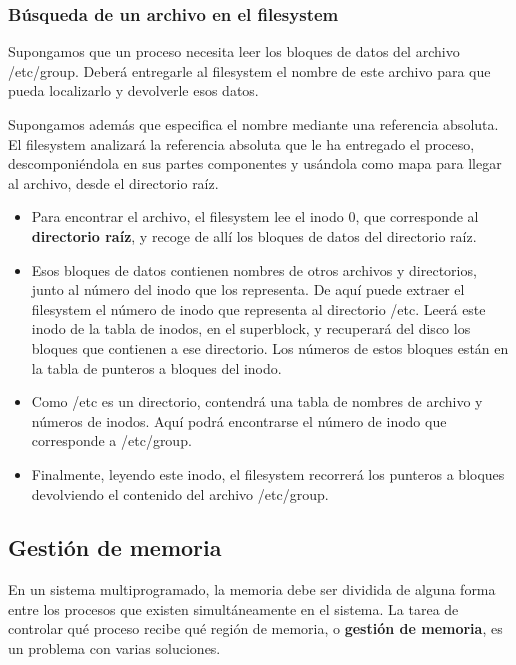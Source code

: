 \documentclass[spanish,a4paper,]{article}
\begin{document}
\hypertarget{buxfasqueda-de-un-archivo-en-el-filesystem}{%
\subsubsection{Búsqueda de un archivo en el
filesystem}\label{buxfasqueda-de-un-archivo-en-el-filesystem}}

Supongamos que un proceso necesita leer los bloques de datos del archivo
/etc/group. Deberá entregarle al filesystem el nombre de este archivo
para que pueda localizarlo y devolverle esos datos.

Supongamos además que especifica el nombre mediante una referencia
absoluta. El filesystem analizará la referencia absoluta que le ha
entregado el proceso, descomponiéndola en sus partes componentes y
usándola como mapa para llegar al archivo, desde el directorio raíz.

\begin{itemize}
\item
  Para encontrar el archivo, el filesystem lee el inodo 0, que
  corresponde al \textbf{directorio raíz}, y recoge de allí los bloques
  de datos del directorio raíz.
\item
  Esos bloques de datos contienen nombres de otros archivos y
  directorios, junto al número del inodo que los representa. De aquí
  puede extraer el filesystem el número de inodo que representa al
  directorio /etc. Leerá este inodo de la tabla de inodos, en el
  superblock, y recuperará del disco los bloques que contienen a ese
  directorio. Los números de estos bloques están en la tabla de punteros
  a bloques del inodo.
\item
  Como /etc es un directorio, contendrá una tabla de nombres de archivo
  y números de inodos. Aquí podrá encontrarse el número de inodo que
  corresponde a /etc/group.
\item
  Finalmente, leyendo este inodo, el filesystem recorrerá los punteros a
  bloques devolviendo el contenido del archivo /etc/group.
\end{itemize}

\hypertarget{gestiuxf3n-de-memoria}{%
\subsection{Gestión de memoria}\label{gestiuxf3n-de-memoria}}

En un sistema multiprogramado, la memoria debe ser dividida de alguna
forma entre los procesos que existen simultáneamente en el sistema. La
tarea de controlar qué proceso recibe qué región de memoria, o
\textbf{gestión de memoria}, es un problema con varias soluciones.
\end{document}
